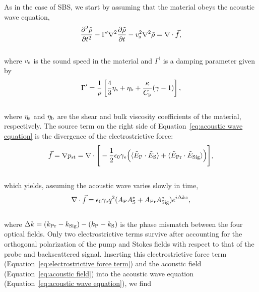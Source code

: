 As in the case of SBS\cite{boyd2020nonlinear}, we start by assuming that the material obeys the acoustic wave equation,
\\
\begin{equation}
    \frac{\partial^{2}\tilde{\rho}}{\partial t^{2}} - \Gamma^{\prime}\nabla^{2}\frac{\partial\tilde{\rho}}{\partial t} - v_{\rm s}^{2}\nabla^{2}\tilde{\rho} = \nabla\cdot\vec{f},
    \label{eq:acoustic wave equation}
\end{equation}
\\
\noindent where \(v_{\rm s}\) is the sound speed in the material and \(\Gamma^{\prime}\) is a damping parameter given by
\\
\begin{equation}
    \Gamma^{\prime} = \frac{1}{\rho}\left[\frac{4}{3}\eta_{\rm s} + \eta_{\rm b} + \frac{\kappa}{C_{\rm p}}(\gamma - 1)\right],
\end{equation}
\\
\noindent where \(\eta_{\rm s}\) and \(\eta_{\rm b}\) are the shear and bulk viscosity coefficients of the material, respectively. The source term on the right side of Equation~\ref{eq:acoustic wave equation} is the divergence of the electrostrictive force:
\\
\begin{equation}
    \vec{f} = \nabla p_{\rm st} = \nabla \cdot \Bigg[-\frac{1}{2}\epsilon_{0}\gamma_{\rm e}\Big(\langle\tilde{E}_{\rm P} \cdot \tilde{E}_{\rm S}\rangle + \langle\tilde{E}_{\rm Pr} \cdot \tilde{E}_{\rm Sig}\rangle\Big)\Bigg],
\end{equation}
\\
which yields, assuming the acoustic wave varies slowly in time,
\\
\begin{equation}
    \nabla\cdot\vec{f} = \epsilon_{0}\gamma_{\rm e}q^{2}(A_{\rm P}A_{\rm S}^{*} + A_{\rm Pr}A_{\rm Sig}^{*})e^{i\Delta kz},
    \label{eq:electrostrictive force term}
\end{equation}
\\
where \(\Delta k = (k_{\rm Pr} - k_{\rm Sig}) - (k_{\rm P} - k_{\rm S})\) is the phase mismatch between the four optical fields. Only two electrostrictive terms survive after accounting for the orthogonal polarization of the pump and Stokes fields with respect to that of the probe and backscattered signal. Inserting this electrostrictive force term (Equation~\ref{eq:electrostrictive force term}) and the acoustic field (Equation~\ref{eq:acoustic field}) into the acoustic wave equation (Equation~\ref{eq:acoustic wave equation}), we find
